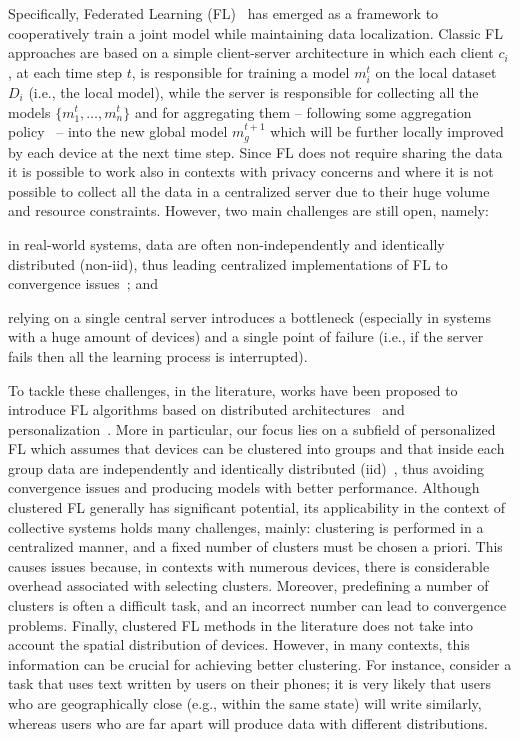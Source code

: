 \documentclass[runningheads]{llncs}
\begin{document}
%
Specifically, Federated Learning (FL)~\cite{DBLP:conf/aistats/McMahanMRHA17} has emerged as a framework to cooperatively train a joint model
 while maintaining data localization.
%
Classic FL approaches are based on a simple client-server architecture in which each client $c_i$, at each time step $t$, is responsible for training 
 a model $m_i^t$ on the local dataset $D_i$ (i.e., the local model), while the server is responsible for collecting all the 
 models $\{m_1^t, \dots, m_n^t\}$ and for aggregating them -- following some aggregation policy~\cite{DBLP:journals/fgcs/QiCGIFP24} -- into the 
 new global model $m_g^{t+1}$ which will be further locally improved by each device at the next time step.
%
Since FL does not require sharing the data it is possible to work also in contexts with privacy concerns and where it is not possible to collect
 all the data in a centralized server due to their huge volume and resource constraints.
%
However, two main challenges are still open, namely:
\begin{enumerate*}[label=(\roman*)]
    \item in real-world systems, data are often non-independently and identically distributed (non-iid), thus leading centralized implementations
     of FL to convergence issues~\cite{DBLP:conf/mir/YangLHSL024}; and
    \item relying on a single central server introduces a bottleneck (especially in systems with a huge amount of devices) 
     and a single point of failure (i.e., if the server fails then all the learning process is interrupted).
\end{enumerate*}

To tackle these challenges, in the literature, works have been proposed to introduce FL algorithms based 
 on distributed architectures~\cite{DBLP:journals/jpdc/HegedusDJ21,DBLP:conf/dsn/WinkN21}
 and personalization~\cite{DBLP:journals/tnn/TanYCY23}.
%
More in particular, our focus lies on a subfield of personalized FL which assumes that devices can be clustered into groups and that inside each 
 group data are independently and identically distributed (iid)~\cite{DBLP:journals/tit/GhoshCYR22,DBLP:conf/ecai/Li0TWXZ23}, 
 thus avoiding convergence issues and producing models with better performance.
% 
Although clustered FL generally has significant potential, its applicability in the context of collective systems holds many challenges, mainly: 
 clustering is performed in a centralized manner, and a fixed number of clusters must be chosen a priori. 
% 
This causes issues because, in contexts with numerous devices, there is considerable overhead associated with selecting clusters. 
%
Moreover, predefining a number of clusters is often a difficult task, and an incorrect number can lead to convergence problems.
%
Finally, clustered FL methods in the literature does not take into account the spatial distribution of devices.
%
However, in many contexts, this information can be crucial for achieving better clustering. 
%
For instance, consider a task that uses text written by users on their phones; it is very likely that users who are 
 geographically close (e.g., within the same state) will write similarly, whereas users who are far apart 
 will produce data with different distributions.
\end{document}

